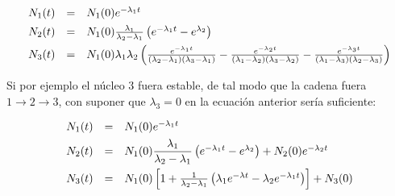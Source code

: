 \begin{equation}
	\begin{array}{ccl} \vspace{1.5mm}
		N_1(t) & = & N_1(0) e^{-\lambda_1 t}\\ \vspace{1.5mm} 
		N_2(t) & = & N_1(0) \frac{\lambda_1}{\lambda_2 - \lambda_1} \parentesis{e^{-\lambda_1 t } - e^{\lambda_2}} \\\vspace{1.5mm}
		N_3(t) & = & N_1(0) \lambda_1 \lambda_2 \parentesis{ \frac{e^{-\lambda_1 t }}{(\lambda_2-\lambda_1)(\lambda_3-\lambda_1)}  -\frac{e^{-\lambda_2 t }}{(\lambda_1-\lambda_2)(\lambda_3-\lambda_2)} -\frac{e^{-\lambda_3 t }}{(\lambda_1-\lambda_3)(\lambda_2-\lambda_3)} }
	\end{array}
\end{equation}
Si por ejemplo el núcleo 3 fuera estable, de tal modo que la cadena fuera $1\rightarrow 2\rightarrow 3$, con suponer que $\lambda_3=0$ en la ecuación anterior sería suficiente:

\begin{equation}
	\begin{array}{ccl} \vspace{1.5mm}
		N_1(t) & = & N_1(0) e^{-\lambda_1 t}\\ \vspace{1.5mm} 
		N_2(t) & = & N_1(0) \dfrac{\lambda_1}{\lambda_2 - \lambda_1} \parentesis{e^{-\lambda_1 t } - e^{\lambda_2}} + N_2(0)e^{-\lambda_2 t} \\\vspace{3mm}
		N_3(t) & = & N_1(0)  \ccorchetes{1 + \frac{1}{\lambda_2-\lambda_1} \parentesis{\lambda_1 e^{-\lambda t} - \lambda_2 e^{-\lambda_1 t}} } + N_3 (0)
	\end{array}
\end{equation}







